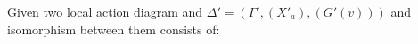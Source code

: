 \documentclass[preview]{standalone}
\begin{document}
\begin{center}
\noindent{}Given two local action diagram  and $\Delta' = (\Gamma', (X'_{a}), (G'(v)))$ and isomorphism between them consists of:
\end{center}
\end{document}
